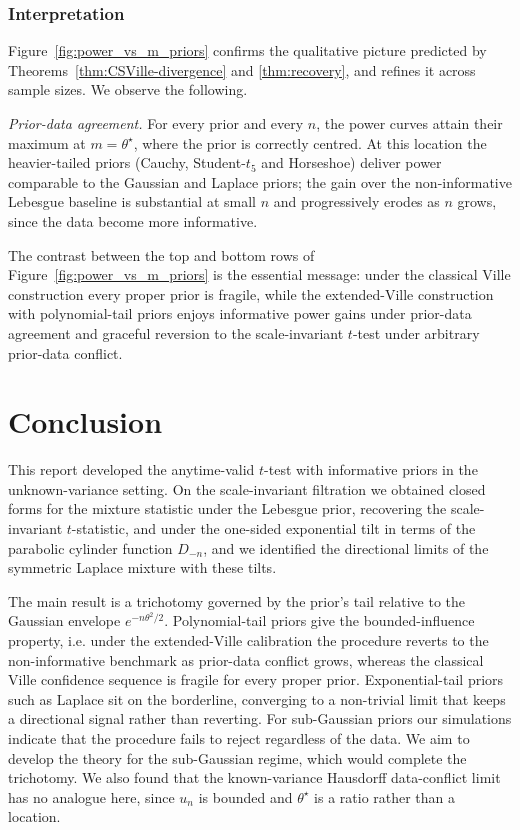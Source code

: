 \documentclass[12pt, a4paper]{report}
\newcommand{\1}{\mathbf{1}}
\begin{document}
\subsubsection{Interpretation}\label{ssec:exp-interp}

Figure~\ref{fig:power_vs_m_priors} confirms the qualitative picture
predicted by Theorems~\ref{thm:CSVille-divergence} and \ref{thm:recovery}, and refines it across sample sizes. We observe the following.

\emph{Prior-data agreement.} For every prior and every \(n\), the power
curves attain their maximum at \(m=\theta^\star\), where the prior is
correctly centred. At this location the heavier-tailed priors (Cauchy, Student-$t_5$ and Horseshoe) deliver power comparable to the Gaussian and Laplace priors;
the gain over the non-informative Lebesgue baseline is substantial at
small \(n\) and progressively erodes as \(n\) grows, since the data become more informative.

The contrast between the top and bottom rows of Figure~\ref{fig:power_vs_m_priors} is the essential message: under the classical Ville construction every proper prior is fragile, while the
extended-Ville construction with polynomial-tail priors enjoys
informative power gains under prior-data agreement and graceful reversion to the scale-invariant \(t\)-test under arbitrary prior-data conflict.


\section{Conclusion}

This report developed the anytime-valid $t$-test with informative priors in the
unknown-variance setting. On the scale-invariant filtration we obtained closed
forms for the mixture statistic under the Lebesgue prior, recovering the
scale-invariant $t$-statistic, and under the one-sided exponential tilt in terms
of the parabolic cylinder function $D_{-n}$, and we identified the directional
limits of the symmetric Laplace mixture with these tilts.

The main result is a trichotomy governed by the prior's tail relative to the
Gaussian envelope $e^{-n\theta^2/2}$. Polynomial-tail priors give the
bounded-influence property, i.e. under the extended-Ville calibration the procedure reverts to the non-informative benchmark as prior-data conflict grows, whereas the classical Ville confidence sequence is fragile for every proper prior. Exponential-tail priors such as Laplace sit on the borderline, converging to a non-trivial limit that keeps a directional signal rather than reverting. For sub-Gaussian priors our
simulations indicate that the procedure fails to reject regardless of the data. We
aim to develop the theory for the sub-Gaussian regime, which would complete the trichotomy. We also found that the known-variance Hausdorff data-conflict limit has no analogue here, since $u_n$ is bounded and $\theta^\star$ is a ratio rather than a location.
\end{document}
